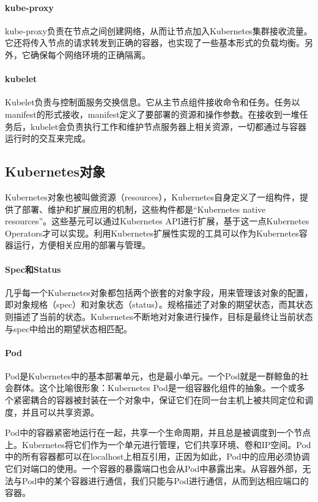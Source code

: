 \documentclass[macfonts,master]{njuthesis}
\begin{document}
\paragraph{kube-proxy}
kube-proxy负责在节点之间创建网络，从而让节点加入Kubernetes集群接收流量。它还将传入节点的请求转发到正确的容器，也实现了一些基本形式的负载均衡。另外，它确保每个网络环境的正确隔离。

\paragraph{kubelet}
Kubelet负责与控制面服务交换信息。它从主节点组件接收命令和任务。任务以manifest的形式接收，manifest定义了要部署的资源和操作参数。在接收到一堆任务后，kubelet会负责执行工作和维护节点服务器上相关资源，一切都通过与容器运行时的交互来完成。

\subsection{Kubernetes对象}
Kubernetes对象也被叫做资源（resources），Kubernetes自身定义了一组构件，提供了部署、维护和扩展应用的机制，这些构件都是“Kubernetes native resources”。这些基元可以通过Kubernetes API进行扩展，基于这一点Kubernetes Operators才可以实现。利用Kubernetes扩展性实现的工具可以作为Kubernetes容器运行，方便相关应用的部署与管理。

\paragraph{Spec和Status}
几乎每一个Kubernetes对象都包括两个嵌套的对象字段，用来管理该对象的配置，即对象规格（spec）和对象状态（status）。规格描述了对象的期望状态，而其状态则描述了当前的状态。Kubernetes不断地对对象进行操作，目标是最终让当前状态与spec中给出的期望状态相匹配。

\paragraph{Pod}
Pod是Kubernetes中的基本部署单元，也是最小单元。一个Pod就是一群鲸鱼的社会群体\cite{k8sconcepts}。这个比喻很形象：Kubernetes Pod是一组容器化组件的抽象。一个或多个紧密耦合的容器被封装在一个对象中，保证它们在同一台主机上被共同定位和调度，并且可以共享资源。

Pod中的容器紧密地运行在一起，共享一个生命周期，并且总是被调度到一个节点上。Kubernetes将它们作为一个单元进行管理，它们共享环境、卷和IP空间。Pod中的所有容器都可以在localhost上相互引用，正因为如此，Pod中的应用必须协调它们对端口的使用。一个容器的暴露端口也会从Pod中暴露出来。从容器外部，无法与Pod中的某个容器进行通信，我们只能与Pod进行通信，从而到达相应端口的容器。
\end{document}
